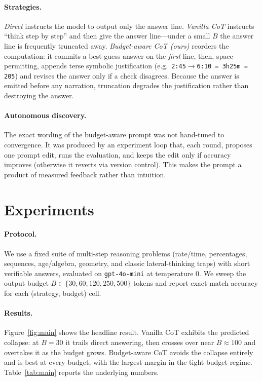 \documentclass{article}
\begin{document}
\paragraph{Strategies.} \emph{Direct} instructs the model to output only the
answer line. \emph{Vanilla CoT} instructs ``think step by step'' and then give
the answer line---under a small $B$ the answer line is frequently truncated away.
\emph{Budget-aware CoT (ours)} reorders the computation: it commits a best-guess
answer on the \emph{first} line, then, space permitting, appends terse symbolic
justification (e.g.\ \texttt{2:45$\to$6:10 = 3h25m = 205}) and revises the answer
only if a check disagrees. Because the answer is emitted before any narration,
truncation degrades the justification rather than destroying the answer.

\paragraph{Autonomous discovery.} The exact wording of the budget-aware prompt
was not hand-tuned to convergence. It was produced by an experiment loop that,
each round, proposes one prompt edit, runs the evaluation, and keeps the edit
only if accuracy improves (otherwise it reverts via version control). This makes
the prompt a product of measured feedback rather than intuition.

\section{Experiments}
\label{sec:experiments}
\paragraph{Protocol.} We use a fixed suite of multi-step reasoning problems
(rate/time, percentages, sequences, age/algebra, geometry, and classic
lateral-thinking traps) with short verifiable answers, evaluated on
\texttt{gpt-4o-mini} at temperature $0$. We sweep the output budget
$B \in \{30, 60, 120, 250, 500\}$ tokens and report exact-match accuracy for
each (strategy, budget) cell.

\paragraph{Results.} Figure~\ref{fig:main} shows the headline result.
Vanilla CoT exhibits the predicted collapse: at $B{=}30$ it trails direct
answering, then crosses over near $B{\approx}100$ and overtakes it as the budget
grows. Budget-aware CoT avoids the collapse entirely and is best at every
budget, with the largest margin in the tight-budget regime.
Table~\ref{tab:main} reports the underlying numbers.
\end{document}
